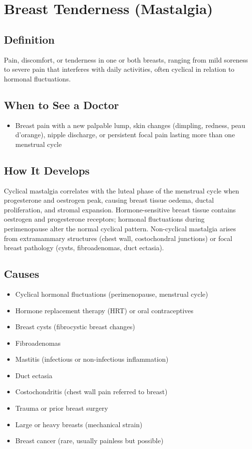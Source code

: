 \chapter{Breast Tenderness (Mastalgia)}

\section*{Definition}
Pain, discomfort, or tenderness in one or both breasts, ranging from mild soreness to severe pain that interferes with daily activities, often cyclical in relation to hormonal fluctuations.

\section*{When to See a Doctor}

\begin{itemize}
 \item Breast pain with a new palpable lump, skin changes (dimpling, redness, peau d'orange), nipple discharge, or persistent focal pain lasting more than one menstrual cycle
\end{itemize}

\section*{How It Develops}
Cyclical mastalgia correlates with the luteal phase of the menstrual cycle when progesterone and oestrogen peak, causing breast tissue oedema, ductal proliferation, and stromal expansion. Hormone-sensitive breast tissue contains oestrogen and progesterone receptors; hormonal fluctuations during perimenopause alter the normal cyclical pattern. Non-cyclical mastalgia arises from extramammary structures (chest wall, costochondral junctions) or focal breast pathology (cysts, fibroadenomas, duct ectasia).

\section*{Causes}
\begin{itemize}
 \item Cyclical hormonal fluctuations (perimenopause, menstrual cycle)
 \item Hormone replacement therapy (HRT) or oral contraceptives
 \item Breast cysts (fibrocystic breast changes)
 \item Fibroadenomas
 \item Mastitis (infectious or non-infectious inflammation)
 \item Duct ectasia
 \item Costochondritis (chest wall pain referred to breast)
 \item Trauma or prior breast surgery
 \item Large or heavy breasts (mechanical strain)
 \item Breast cancer (rare, usually painless but possible)
\end{itemize}

